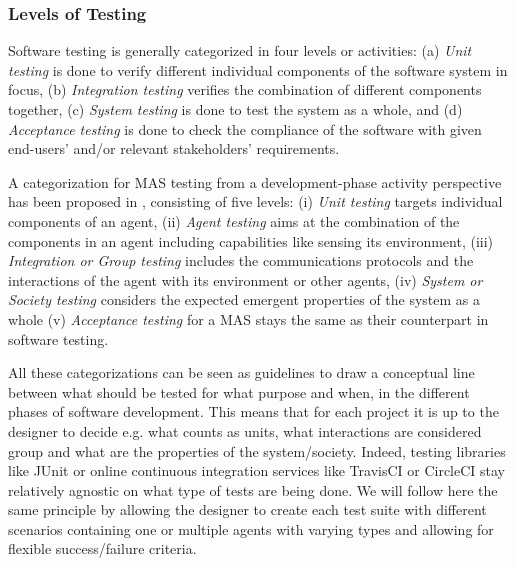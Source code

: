 \subsubsection{Levels of Testing}
Software testing is generally categorized in four levels or activities: (a) \textit{Unit testing} is done to verify different individual components of the software system in focus, (b) \textit{Integration testing} verifies the combination of different components together, (c) \textit{System testing} is done to test the system as a whole, and (d) \textit{Acceptance testing} is done to check the compliance of the software with given end-users' and/or relevant stakeholders' requirements. 


A categorization for MAS testing from a development-phase activity perspective has been proposed in \cite{Moreno2009}, consisting of five levels: (i) \textit{Unit testing} targets individual components of an agent, (ii) \textit{Agent testing} aims at the combination of the components in an agent including capabilities like sensing its environment, (iii) \textit{Integration or Group testing} includes the communications protocols and the interactions of the agent with its environment or other agents, (iv) \textit{System or Society testing} considers the expected emergent properties of the system as a whole (v) \textit{Acceptance testing} for a MAS stays the same as their counterpart in software testing. %

All these categorizations can be seen as guidelines to draw a conceptual line between what should be tested for what purpose and when, %
in the different phases of software development. This means that for each project it is up to the designer to decide e.g. what counts as units, what interactions are considered group and what are the properties of the system/society. Indeed, testing libraries like JUnit or online continuous integration services like TravisCI or CircleCI stay relatively agnostic on what type of tests are being done. 
We will follow here the same principle by allowing the designer to create each test suite with different scenarios containing one or multiple agents with varying types and allowing for flexible success/failure criteria.

